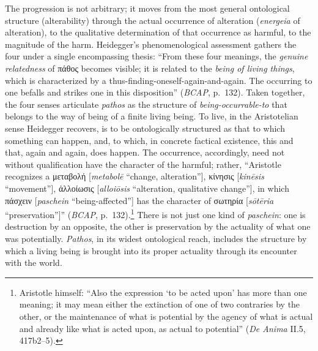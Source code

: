 \documentclass{article}
\newcommand{\gk}[1]{{\greekfont #1}}
\begin{document}
The progression is not arbitrary; it moves from the most general ontological structure (alterability) through the actual occurrence of alteration (\textit{energeia} of alteration), to the qualitative determination of that occurrence as harmful, to the magnitude of the harm. Heidegger's phenomenological assessment gathers the four under a single encompassing thesis: ``From these four meanings, the \textit{genuine relatedness} of \gk{πάθος} becomes visible; it is related to the \textit{being of living things}, which is characterized by a thus-finding-oneself-again-and-again. The occurring to one befalls and strikes one in this disposition'' (\textit{BCAP}, p.~132). Taken together, the four senses articulate \textit{pathos} as the structure of \textit{being-occurrable-to} that belongs to the way of being of a finite living being. To live, in the Aristotelian sense Heidegger recovers, is to be ontologically structured as that to which something can happen, and, to which, in concrete factical existence, this and that, again and again, does happen. The occurrence, accordingly, need not without qualification have the character of the harmful; rather, ``Aristotle recognizes a \gk{μεταβολή} [\textit{metabolē} ``change, alteration''], \gk{κίνησις} [\textit{kinēsis} ``movement''], \gk{ἀλλοίωσις} [\textit{alloiōsis} ``alteration, qualitative change''], in which \gk{πάσχειν} [\textit{paschein} ``being-affected''] has the character of \gk{σωτηρία} [\textit{sōtēria} ``preservation'']'' (\textit{BCAP}, p.~132).\footnote{Aristotle himself: ``Also the expression `to be acted upon' has more than one meaning; it may mean either the extinction of one of two contraries by the other, or the maintenance of what is potential by the agency of what is actual and already like what is acted upon, as actual to potential'' (\textit{De Anima} II.5, 417b2--5).} There is not just one kind of \textit{paschein}: one is destruction by an opposite, the other is preservation by the actuality of what one was potentially. \textit{Pathos}, in its widest ontological reach, includes the structure by which a living being is brought into its proper actuality through its encounter with the world.
\end{document}
